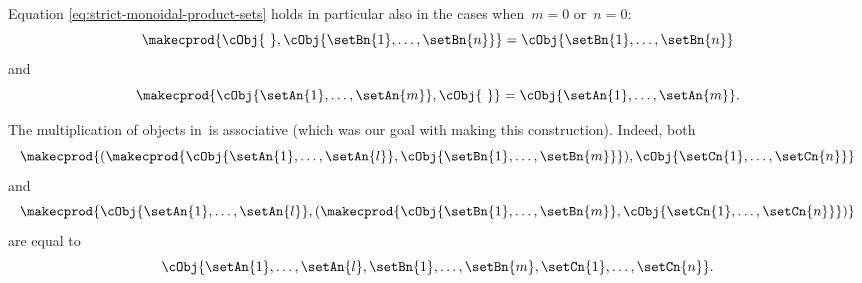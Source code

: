 Equation \cref{eq:strict-monoidal-product-sets} holds in particular also in the cases when~$m = 0$ or~$n =0$:
\begin{equation}
    \makecprod{
        \cObj{ \ },
        \cObj{\setBn{1}, \ldots, \setBn{n}}
    } =
    \cObj{
        \setBn{1}, \ldots, \setBn{n}
    }
\end{equation}
and
\begin{equation}
    \makecprod{
        \cObj{\setAn{1}, \ldots, \setAn{m}},
        \cObj{ \ }
    } =
    \cObj{
        \setAn{1}, \ldots, \setAn{m}
    }.
\end{equation}


The multiplication of objects in~\SetL is associative (which was our goal with making this construction).
Indeed, both
\begin{equation}
    \makecprod{
        ( \makecprod{\cObj{\setAn{1}, \ldots, \setAn{l}}, \cObj{\setBn{1}, \ldots, \setBn{m}}})
        ,
        \cObj{\setCn{1}, \ldots, \setCn{n}}
    }
\end{equation}
and
\begin{equation}
    \makecprod{
        \cObj{\setAn{1}, \ldots, \setAn{l}},
        (
        \makecprod{
            \cObj{\setBn{1}, \ldots, \setBn{m}},
            \cObj{\setCn{1}, \ldots, \setCn{n}}
        }
        )
    }
\end{equation}
are equal to
\begin{equation}
    \cObj{\setAn{1}, \ldots, \setAn{l}, \setBn{1}, \ldots, \setBn{m}, \setCn{1}, \ldots, \setCn{n}}.
\end{equation}
